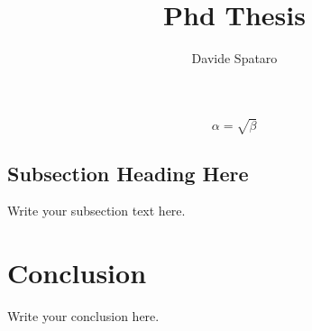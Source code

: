 \documentclass{report}
\begin{document}
\title{Phd Thesis}
\author{Davide Spataro}

\maketitle


\pagestyle{plain}
\setcounter{tocdepth}{5}

\tableofcontents


%
%








\begin{equation}
    \label{simple_equation}
    \alpha = \sqrt{ \beta }
\end{equation}

\subsection{Subsection Heading Here}
Write your subsection text here.


\section{Conclusion}
Write your conclusion here.
\end{document}
